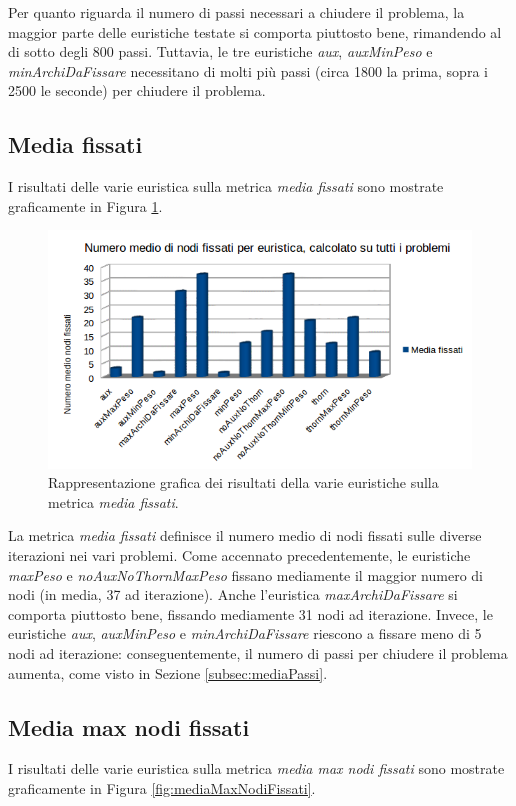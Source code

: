 Per quanto riguarda il numero di passi necessari a chiudere il problema, la maggior parte delle euristiche testate si comporta piuttosto bene, rimandendo al di sotto degli 800 passi. Tuttavia, le tre euristiche \textit{aux}, \textit{auxMinPeso} e \textit{minArchiDaFissare} necessitano di molti più passi (circa 1800 la prima, sopra i 2500 le seconde) per chiudere il problema.

\subsection{Media fissati}
I risultati delle varie euristica sulla metrica \textit{media fissati} sono mostrate graficamente in Figura \ref{fig:mediaFissati}.

\begin{figure}[H]
\includegraphics[width=\textwidth]{res/img/nodiFissati.png}
\caption{Rappresentazione grafica dei risultati della varie euristiche sulla metrica \textit{media fissati}.}
\label{fig:mediaFissati}
\end{figure}

La metrica \textit{media fissati} definisce il numero medio di nodi fissati sulle diverse iterazioni nei vari problemi. Come accennato precedentemente, le euristiche \textit{maxPeso} e \textit{noAuxNoThornMaxPeso} fissano mediamente il maggior numero di nodi (in media, 37 ad iterazione). Anche l'euristica \textit{maxArchiDaFissare} si comporta piuttosto bene, fissando mediamente 31 nodi ad iterazione. Invece, le euristiche \textit{aux}, \textit{auxMinPeso} e \textit{minArchiDaFissare} riescono a fissare meno di 5 nodi ad iterazione: conseguentemente, il numero di passi per chiudere il problema aumenta, come visto in Sezione \ref{subsec:mediaPassi}.

\subsection{Media max nodi fissati}
I risultati delle varie euristica sulla metrica \textit{media max nodi fissati} sono mostrate graficamente in Figura \ref{fig:mediaMaxNodiFissati}.

